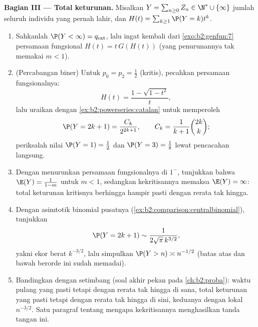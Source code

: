 \begin{problem}
\medskip
\noindent\textbf{Bagian III --- Total keturunan.} Misalkan $Y =
\sum_{n\geq0}Z_n \in \N^* \cup \{\infty\}$ jumlah seluruh
individu yang pernah lahir, dan $H(t) =
\sum_{k\geq1}\P(Y = k)t^k$.
\begin{enumerate}[resume]
  \item Sahkanlah $\P(Y < \infty) = q_{\mathrm{ext}}$, lalu
        ingat kembali dari \cref{exo:b2:genfun:7} persamaan
        fungsional $H(t) = t\,G(H(t))$ (yang penurunannya tak
        memakai $m < 1$).
  \item (Percabangan biner) Untuk $p_0 = p_2 = \frac12$
        (kritis), pecahkan persamaan fungsionalnya:
        \[
        H(t) = \frac{1 - \sqrt{1 - t^2}}{t},
        \]
        lalu uraikan dengan \cref{ex:b2:powerseries:catalan} untuk
        memperoleh
        \[
        \P(Y = 2k + 1) = \frac{C_k}{2^{2k+1}},
        \qquad C_k = \frac1{k+1}\binom{2k}k ;
        \]
        periksalah nilai $\P(Y = 1) = \frac12$ dan $\P(Y = 3)
        = \frac18$ lewat pencacahan langsung.
  \item Dengan menurunkan persamaan fungsionalnya di $1^-$,
        tunjukkan bahwa $\E(Y) = \frac{1}{1-m}$ untuk $m < 1$, sedangkan
        kekritisannya memaksa $\E(Y) = \infty$: total keturunan
        kritisnya berhingga hampir pasti dengan rerata tak
        hingga.
  \item Dengan asimtotik binomial pusatnya
        (\cref{ex:b2:comparison:centralbinomial}), tunjukkan
        \[
        \P(Y = 2k+1) \sim \frac{1}{2\sqrt\pi\,k^{3/2}},
        \]
        yakni ekor berat $k^{-3/2}$, lalu simpulkan $\P(Y > n)
        \asymp n^{-1/2}$ (batas atas dan bawah berorde ini
        sudah memadai).
  \item Bandingkan dengan  setimbang (soal akhir
        pekan pada \cref{ch:b2:proba}): waktu pulang yang pasti tetapi
        dengan rerata tak hingga di sana, total keturunan yang pasti tetapi
        dengan rerata tak hingga di sini, keduanya dengan
         lokal $n^{-3/2}$. Satu paragraf tentang mengapa
        kekritisannya menghasilkan tanda tangan ini.
\end{enumerate}


\end{problem}
